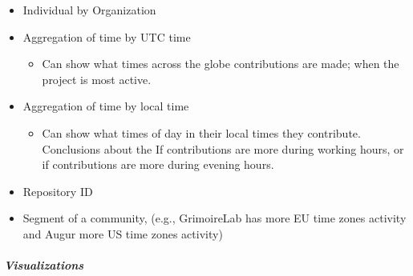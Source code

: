 \begin{itemize}
\tightlist
\item
  Individual by Organization
\item
  Aggregation of time by UTC time

  \begin{itemize}
  \tightlist
  \item
    Can show what times across the globe contributions are made; when
    the project is most active.
  \end{itemize}
\item
  Aggregation of time by local time

  \begin{itemize}
  \tightlist
  \item
    Can show what times of day in their local times they contribute.
    Conclusions about the If contributions are more during working
    hours, or if contributions are more during evening hours.
  \end{itemize}
\item
  Repository ID
\item
  Segment of a community, (e.g., GrimoireLab has more EU time zones
  activity and Augur more US time zones activity)
\end{itemize}

\hypertarget{visualizations}{%
\subparagraph{Visualizations}\label{visualizations}}

